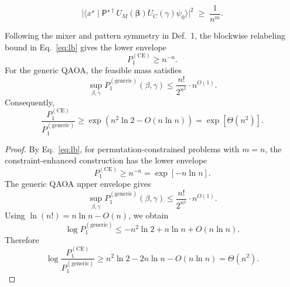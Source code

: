 \documentclass[10pt,a4paper]{amsart}
\begin{document}
\begin{equation}
  \bigl|\langle x^{\star}\!\mid
          \mathsf P^{\star\dagger}
          U_{M}(\boldsymbol\beta)
          U_{C}(\gamma)
          \psi_{0}\rangle
  \bigr|^{2}
  \;\ge\;
  \frac{1}{n^{m}}.
  \label{eq:lb}
\end{equation}

\begin{theorem} 
\label{thm:p1-sep}

Following the mixer and pattern symmetry in Def.~1, the blockwise relabeling
bound in Eq.~\eqref{eq:lb} gives the lower envelope
\[
  P_{1}^{\mathrm{(CE)}}\ge n^{-n}.
\]
For the generic QAOA, the feasible mass satisfies
\[
  \sup_{\beta,\gamma} P_{1}^{\mathrm{(generic)}}(\beta,\gamma)
  \le
  \frac{n!}{2^{n^2}}\cdot n^{O(1)}.
\]
Consequently,
\[
  \frac{P_{1}^{\mathrm{(CE)}}}{P_{1}^{\mathrm{(generic)}}}
  \ge
  \exp\!\left(n^2\ln 2-O(n\ln n)\right)
  =
  \exp[\Theta(n^2)].
\]
\end{theorem}

\begin{proof}
By Eq.~\eqref{eq:lb}, for permutation-constrained problems with \(m=n\), the
constraint-enhanced construction has the lower envelope
\[
  P_{1}^{\mathrm{(CE)}}\ge n^{-n}=\exp[-n\ln n].
\]
The generic QAOA upper envelope gives
\[
  \sup_{\beta,\gamma}P_{1}^{\mathrm{(generic)}}(\beta,\gamma)
  \le
  \frac{n!}{2^{n^2}}\cdot n^{O(1)}.
\]
Using \(\ln(n!)=n\ln n-O(n)\), we obtain
\[
  \log P_{1}^{\mathrm{(generic)}}
  \le
  -n^2\ln 2+n\ln n+O(n\ln n).
\]
Therefore
\[
  \log\frac{P_{1}^{\mathrm{(CE)}}}{P_{1}^{\mathrm{(generic)}}}
  \ge
  n^2\ln 2-2n\ln n-O(n\ln n)
  =
  \Theta(n^2).
\]
\end{proof}
\end{document}
